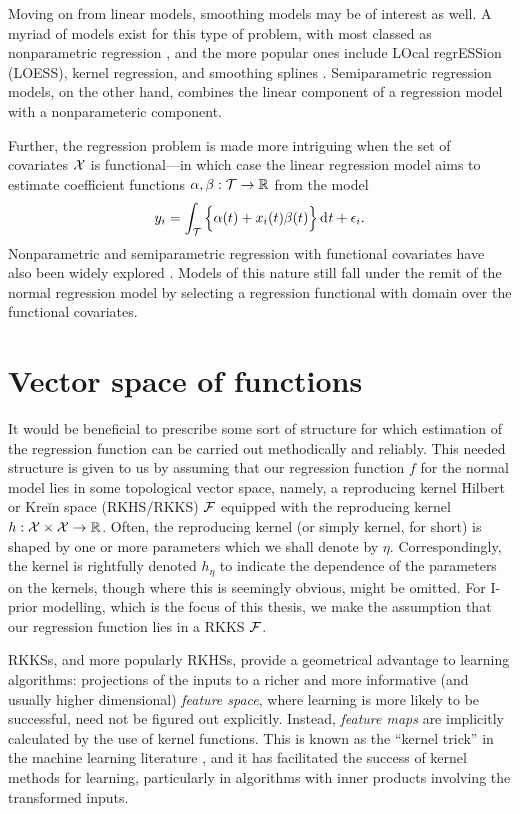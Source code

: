\documentclass[11pt,twoside,openright,showframe]{report}
\begin{document}
Moving on from linear models, smoothing models may be of interest as well.
A myriad of models exist for this type of problem, with most classed as nonparametric regression \citep{wassermann2006all}, and the more popular ones include LOcal regrESSion (LOESS), kernel regression, and smoothing splines \citep{wahba1990spline}.
Semiparametric regression models, on the other hand, combines the linear component of a regression model with a nonparameteric component.

Further, the regression problem is made more intriguing when the set of covariates ${\mathcal X}$ is functional---in which case the linear regression model aims to estimate coefficient functions $\alpha,\beta:{\mathcal T} \to \mathbb{R}$ from the model
\[
  y_i = \int_{\mathcal T} \Big\{ \alpha(t) + x_i(t)\beta(t) \Big\} \operatorname{d}\hspace{0.5pt}\! t + \epsilon_i.
\]
Nonparametric and semiparametric regression with functional covariates have also been widely explored \citep{ramsay2005functional}.
Models of this nature still fall under the remit of the normal regression model by selecting a regression functional with domain over the functional covariates.

\section{Vector space of functions}

It would be beneficial to prescribe some sort of structure for which estimation of the regression function can be carried out methodically and reliably. 
This needed structure is given to us by assuming that our regression function $f$ for the normal model lies in some topological vector space, namely, a reproducing kernel Hilbert or Kreĭn space (RKHS/RKKS) ${\mathcal F}$ equipped with the reproducing kernel $h:{\mathcal X} \times {\mathcal X} \to \mathbb{R}$.
Often, the reproducing kernel (or simply kernel, for short) is shaped by one or more parameters which we shall denote by $\eta$.
Correspondingly, the kernel is rightfully denoted $h_\eta$ to indicate the dependence of the parameters on the kernels, though where this is seemingly obvious, might be omitted.
For I-prior modelling, which is the focus of this thesis, we make the assumption that our regression function lies in a RKKS ${\mathcal F}$.

RKKSs, and more popularly RKHSs, provide a geometrical advantage to learning algorithms: projections of the inputs to a richer and more informative (and usually higher dimensional) \emph{feature space}, where learning is more likely to be successful, need not be figured out explicitly.
Instead, \emph{feature maps} are implicitly calculated by the use of kernel functions. 
This is known as the ``kernel trick'' in the machine learning literature \citep{hofmann2008kernel}, and it has facilitated the success of kernel methods for learning, particularly in algorithms with inner products involving the transformed inputs. 
\end{document}
